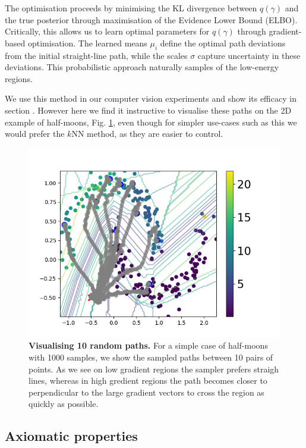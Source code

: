 The optimisation proceeds by minimising the KL divergence between $q(\gamma)$ and the true posterior through maximisation of the Evidence Lower Bound (ELBO). Critically, this allows us to learn optimal parameters for $q(\gamma)$ through gradient-based optimisation. The learned means $\mu_i$ define the optimal path deviations from the initial straight-line path, while the scales $\sigma$ capture uncertainty in these deviations. This probabilistic approach naturally samples of the low-energy regions.

We use this method in our computer vision experiments and show its efficacy in section \label{sec:experiments}. However here we find it instructive to visualise these paths on the 2D example of half-moons, Fig. \ref{fig:svi_moons}, even though for simpler use-cases such as this we would prefer the $k$NN method, as they are easier to control. 

\begin{figure}[ht]
	\vskip 0.2in
	\begin{center}
		\centerline{\includegraphics[width=0.95\columnwidth]{figures/svi_ig_moons.png}}
		\caption{\textbf{Visualising 10 random paths.} For a simple case of half-moons with 1000 samples, we show the sampled paths between 10 pairs of points. As we see on low gradient regions the sampler prefers straigh lines, whereas in high gredient regions the path becomes closer to perpendicular to the large gradient vectors to cross the region as quickly as possible.}
		\label{fig:svi_moons}
	\end{center}
	\vskip -0.2in
\end{figure}

\subsection{Axiomatic properties}

